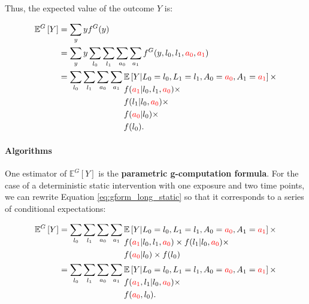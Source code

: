 \documentclass[12pt,twoside]{article}
\begin{document}
Thus, the expected value of the outcome $Y$ is:

\begin{align}
    \mathbb{E}^G \left[ Y \right] &= \sum_y y f^G(y) \\
    &= \sum_y y \sum_{l_0} \sum_{l_1} \sum_{a_0} \sum_{a_1} f^G(y,l_0,l_1,\textcolor{red}{a_0},\textcolor{red}{a_1}) \\
    &= \sum_{l_0} \sum_{l_1} \sum_{a_0} \sum_{a_1}
    \!\begin{aligned}[t] \label{eq:gform_long_static}
        &\mathbb{E} \left[ Y|L_0=l_0,L_1=l_1,A_0=\textcolor{red}{a_0},A_1=\textcolor{red}{a_1} \right]\times\\
        &f(\textcolor{red}{a_1}|l_0,l_1,\textcolor{red}{a_0})\times\\
        &f(l_1|l_0,\textcolor{red}{a_0})\times\\
        &f(\textcolor{red}{a_0}|l_0)\times\\
        &f(l_0).
    \end{aligned}
\end{align}

\paragraph*{Algorithms}
One estimator of $\mathbb{E}^G [Y]$ is the \textbf{parametric g-computation formula}. For the case of a deterministic static intervention with one exposure and two time points, we can rewrite Equation \ref{eq:gform_long_static} so that it corresponds to a series of conditional expectations:

\begin{align}
    \mathbb{E}^G \left[ Y \right]
    &= \sum_{l_0} \sum_{l_1} \sum_{a_0} \sum_{a_1}
    \!\begin{aligned}[t]
        &\mathbb{E} \left[ Y|L_0=l_0,L_1=l_1,A_0=\textcolor{red}{a_0},A_1=\textcolor{red}{a_1} \right] \times \\
        &f(\textcolor{red}{a_1}|l_0,l_1,\textcolor{red}{a_0}) \times f(l_1|l_0,\textcolor{red}{a_0}) \times \\
        &f(\textcolor{red}{a_0}|l_0) \times f(l_0)
    \end{aligned} \\
    &= \sum_{l_0} \sum_{l_1} \sum_{a_0} \sum_{a_1}
    \!\begin{aligned}[t] \label{eq:nested_gcom_long_static}
        &\mathbb{E} \left[ Y|L_0=l_0,L_1=l_1,A_0=\textcolor{red}{a_0},A_1=\textcolor{red}{a_1} \right] \times \\
        &f(\textcolor{red}{a_1},l_1|l_0,\textcolor{red}{a_0}) \times \\
        &f(\textcolor{red}{a_0},l_0).
    \end{aligned}
\end{align}
\end{document}

